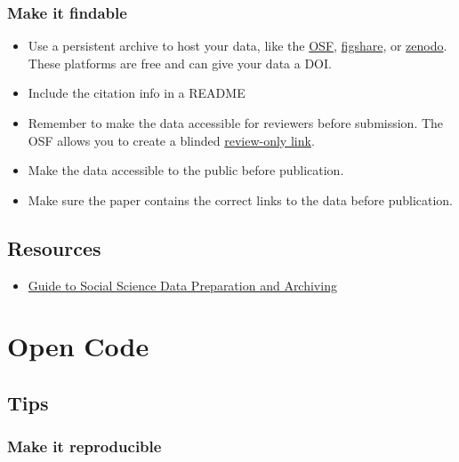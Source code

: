\documentclass[
  oneside]{book}
\providecommand{\tightlist}{%
  \setlength{\itemsep}{0pt}\setlength{\parskip}{0pt}}
\begin{document}
\hypertarget{make-it-findable}{%
\subsection{Make it findable}\label{make-it-findable}}

\begin{itemize}
\tightlist
\item
  Use a persistent archive to host your data, like the \href{https://osf.io}{OSF}, \href{https://figshare.com/}{figshare}, or \href{https://zenodo.org/}{zenodo}. These platforms are free and can give your data a DOI.
\item
  Include the citation info in a README
\item
  Remember to make the data accessible for reviewers before submission. The OSF allows you to create a blinded \href{https://help.osf.io/hc/en-us/articles/360019930333-Create-a-View-only-Link-for-a-Project}{review-only link}.
\item
  Make the data accessible to the public before publication.
\item
  Make sure the paper contains the correct links to the data before publication.
\end{itemize}

\hypertarget{resources-6}{%
\section{Resources}\label{resources-6}}

\begin{itemize}
\tightlist
\item
  \href{https://www.icpsr.umich.edu/web/pages/deposit/guide/index.html}{Guide to Social Science Data Preparation and Archiving}
\end{itemize}

\hypertarget{open-code-1}{%
\chapter{Open Code}\label{open-code-1}}

\hypertarget{author-code-tips}{%
\section{Tips}\label{author-code-tips}}

\hypertarget{make-it-reproducible}{%
\subsection{Make it reproducible}\label{make-it-reproducible}}
\end{document}
